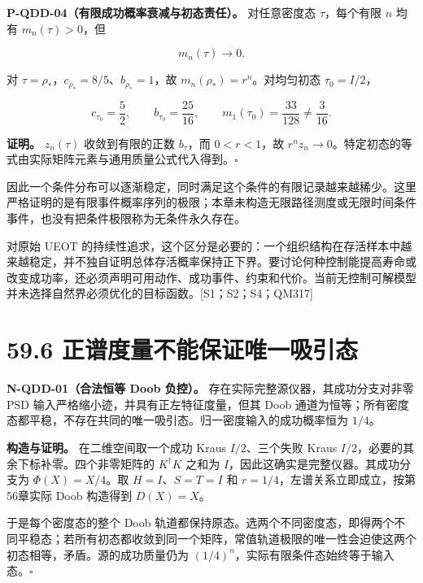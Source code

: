 \documentclass[
  11pt,
  oneside]{book}
\begin{document}
\protect\hypertarget{p-qdd-04}{}{}

\textbf{P-QDD-04（有限成功概率衰减与初态责任）。} 对任意密度态
\(\tau\)，每个有限 \(n\) 均有 \(m_n(\tau)>0\)，但

\[
m_n(\tau)\longrightarrow0.
\]

对 \(\tau=\rho_*\)，\(c_{\rho_*}=8/5\)、\(b_{\rho_*}=1\)，故
\(m_n(\rho_*)=r^n\)。对均匀初态 \(\tau_0=I/2\)，

\[
c_{\tau_0}=\frac52,\qquad b_{\tau_0}=\frac{25}{16},\qquad
m_1(\tau_0)=\frac{33}{128}\ne\frac3{16}.
\]

\textbf{证明。} \(z_n(\tau)\) 收敛到有限的正数 \(b_\tau\)，而
\(0<r<1\)，故
\(r^nz_n\to0\)。特定初态的等式由实际矩阵元素与通用质量公式代入得到。\(\square\)

因此一个条件分布可以逐渐稳定，同时满足这个条件的有限记录越来越稀少。这里严格证明的是有限事件概率序列的极限；本章未构造无限路径测度或无限时间条件事件，也没有把条件极限称为无条件永久存在。

对原始 UEOT
的持续性追求，这个区分是必要的：一个组织结构在存活样本中越来越稳定，并不独自证明总体存活概率保持正下界。要讨论何种控制能提高寿命或改变成功率，还必须声明可用动作、成功事件、约束和代价。当前无控制可解模型并未选择自然界必须优化的目标函数。{[}S1；S2；S4；QM317{]}

\hypertarget{ux6b63ux8c31ux5ea6ux91cfux4e0dux80fdux4fddux8bc1ux552fux4e00ux5438ux5f15ux6001}{%
\section{59.6
正谱度量不能保证唯一吸引态}\label{ux6b63ux8c31ux5ea6ux91cfux4e0dux80fdux4fddux8bc1ux552fux4e00ux5438ux5f15ux6001}}

\protect\hypertarget{n-qdd-01}{}{}

\textbf{N-QDD-01（合法恒等 Doob 负控）。}
存在实际完整源仪器，其成功分支对非零 PSD
输入严格缩小迹，并具有正左特征度量，但其 Doob
通道为恒等；所有密度态都平稳，不存在共同的唯一吸引态。归一密度输入的成功概率恒为
\(1/4\)。

\textbf{构造与证明。} 在二维空间取一个成功 Kraus \(I/2\)、三个失败 Kraus
\(I/2\)，必要的其余下标补零。四个非零矩阵的 \(K^\dagger K\) 之和为
\(I\)，因此这确实是完整仪器。其成功分支为 \(\Phi(X)=X/4\)。取
\(H=I\)、\(S=T=I\) 和 \(r=1/4\)，左谱关系立即成立，按第56章实际 Doob
构造得到 \(D(X)=X\)。

于是每个密度态的整个 Doob
轨道都保持原态。选两个不同密度态，即得两个不同平稳态；若所有初态都收敛到同一个矩阵，常值轨道极限的唯一性会迫使这两个初态相等，矛盾。源的成功质量仍为
\((1/4)^n\)，实际有限条件态始终等于输入态。\(\square\)
\end{document}
